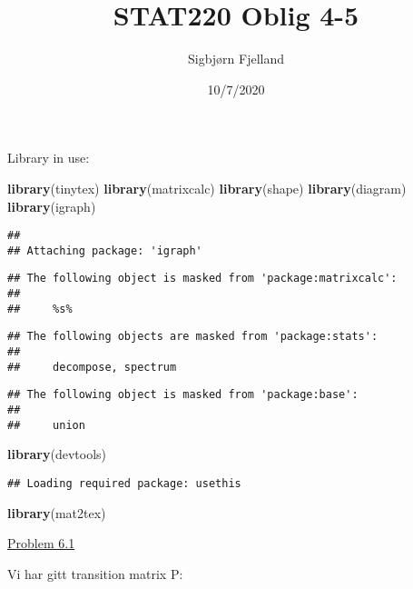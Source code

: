 \documentclass[]{article}
\title{STAT220 Oblig 4-5}
\author{Sigbjørn Fjelland}
\date{10/7/2020}
\newenvironment{Shaded}{\begin{snugshade}}{\end{snugshade}}
\newcommand{\KeywordTok}[1]{\textcolor[rgb]{0.13,0.29,0.53}{\textbf{#1}}}
\newcommand{\NormalTok}[1]{#1}
\begin{document}
\maketitle

Library in use:

\begin{Shaded}
\begin{Highlighting}[]
\KeywordTok{library}\NormalTok{(tinytex)}
\KeywordTok{library}\NormalTok{(matrixcalc)}
\KeywordTok{library}\NormalTok{(shape)}
\KeywordTok{library}\NormalTok{(diagram)}
\KeywordTok{library}\NormalTok{(igraph)}
\end{Highlighting}
\end{Shaded}

\begin{verbatim}
## 
## Attaching package: 'igraph'
\end{verbatim}

\begin{verbatim}
## The following object is masked from 'package:matrixcalc':
## 
##     %s%
\end{verbatim}

\begin{verbatim}
## The following objects are masked from 'package:stats':
## 
##     decompose, spectrum
\end{verbatim}

\begin{verbatim}
## The following object is masked from 'package:base':
## 
##     union
\end{verbatim}

\begin{Shaded}
\begin{Highlighting}[]
\KeywordTok{library}\NormalTok{(devtools)}
\end{Highlighting}
\end{Shaded}

\begin{verbatim}
## Loading required package: usethis
\end{verbatim}

\begin{Shaded}
\begin{Highlighting}[]
\KeywordTok{library}\NormalTok{(mat2tex)}
\end{Highlighting}
\end{Shaded}

\underline{Problem 6.1}

Vi har gitt transition matrix P:
\end{document}
